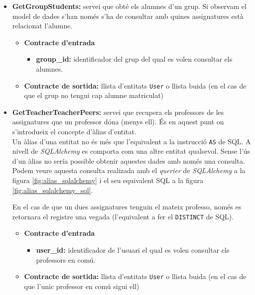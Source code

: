 \begin{itemize}
			\item \textbf{GetGroupStudents:} servei que obté els alumnes d'un grup. Si observam el model de dades s'han només s'ha de consultar amb quines assignatures està relacionat l'alumne.
				\begin{itemize}
					\item \textbf{Contracte d'entrada}
						\begin{itemize}
							\item \textbf{group\_id:} identificador del grup del qual es volen consultar els alumnes.
						\end{itemize}
					\item \textbf{Contracte de sortida:} llista d'entitats \texttt{User} o llista buida (en el cas de que el grup no tengui cap alumne matriculat)
				\end{itemize}
				
			\item \textbf{GetTeacherTeacherPeers:} servei que recupera els professors de les assignatures que un professor dóna (menys ell). És en aquest punt on s'introdueix el concepte d'àlias d'entitat. \\
			
			Un àlias d'una entitat no és més que l'equivalent a la instrucció \texttt{AS} de \ac{SQL}. A nivell de \emph{SQLAlchemy} es comporta com una altre entitat qualsevol. Sense l'ús d'un àlias no sería possible obtenir aquestes dades amb només una consulta. Podem veure aquesta consulta realizada amb el \emph{querier} de \emph{SQLAlchemy} a la figura \ref{fig:alias_sqlalchemy} i el seu equivalent SQL a la figura \ref{fig:alias_sqlalchemy_sql}.
			
			En el cas de que un dues assignatures tenguin el mateix professo, només es retornara el registre una vegada (l'equivalent a fer el \texttt{DISTINCT} de \ac{SQL}).
			
			\begin{itemize}
					\item \textbf{Contracte d'entrada}
						\begin{itemize}
							\item \textbf{user\_id:} identificador de l'usuari el qual es volen consultar els professors en comú.
						\end{itemize}
					\item \textbf{Contracte de sortida:} llista d'entitats \texttt{User} o llista buida (en el cas de que l'unic professor en comú sigui ell)
				\end{itemize}
			

\end{itemize}
